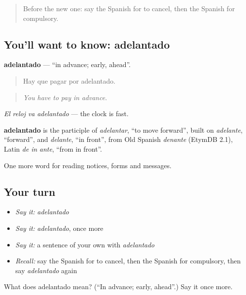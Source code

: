 \begin{quote}
Before the new one: say the Spanish for to cancel, then the Spanish for compulsory.
\end{quote}

\subsection*{You'll want to know: adelantado}
\textbf{adelantado} — \textquotedblleft{}in advance; early, ahead\textquotedblright{}.

\begin{quote}
Hay que pagar por adelantado.
\end{quote}

\begin{quote}
\emph{You have to pay in advance.}
\end{quote}

\emph{El reloj va adelantado} — the clock is fast.

\begin{cousinweb}
\textbf{adelantado} is the participle of \emph{adelantar}, \textquotedblleft{}to move forward\textquotedblright{}, built on \emph{adelante}, \textquotedblleft{}forward\textquotedblright{}, and \emph{delante}, \textquotedblleft{}in front\textquotedblright{}, from Old Spanish \emph{denante} (EtymDB 2.1), Latin \emph{de in ante}, \textquotedblleft{}from in front\textquotedblright{}.
\end{cousinweb}

\begin{grammarlens}[title={What you've built}]
One more word for reading notices, forms and messages.
\end{grammarlens}

\subsection*{Your turn}
\begin{itemize}
\raggedright
  \item \emph{Say it:} \emph{adelantado}
  \item \emph{Say it:} \emph{adelantado}, once more
  \item \emph{Say it:} a sentence of your own with \emph{adelantado}
  \item \emph{Recall:} say the Spanish for to cancel, then the Spanish for compulsory, then say \emph{adelantado} again
\end{itemize}

\begin{tcolorbox}[breakable,colback=teal!4,colframe=teal!35!black,title={Before you move on}]
What does adelantado mean? (\textquotedblleft{}In advance; early, ahead\textquotedblright{}.) Say it once more.
\end{tcolorbox}
